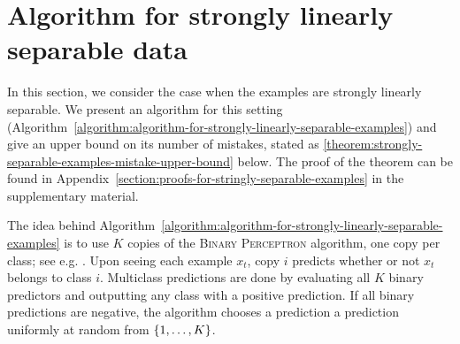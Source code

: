 \section{Algorithm for strongly linearly separable data}
\label{section:algorithm-for-strongly-linearly-separable-data}

In this section, we consider the case when the examples are strongly linearly
separable. We present an algorithm for this setting
(Algorithm~\ref{algorithm:algorithm-for-strongly-linearly-separable-examples})
and give an upper bound on its number of mistakes, stated as
\autoref{theorem:strongly-separable-examples-mistake-upper-bound} below. The
proof of the theorem can be found in
Appendix~\ref{section:proofs-for-stringly-separable-examples} in the
supplementary material.

The idea behind
Algorithm~\ref{algorithm:algorithm-for-strongly-linearly-separable-examples} is
to use $K$ copies of the \textsc{Binary Perceptron} algorithm, one copy per
class; see e.g. \citep[Section 3.3.1]{Shalev-Shwartz-2012}. Upon seeing each
example $x_t$, copy $i$ predicts whether or not $x_t$ belongs to class $i$.
Multiclass predictions are done by evaluating all $K$ binary predictors and
outputting any class with a positive prediction.  If all binary predictions are
negative, the algorithm chooses a prediction a prediction uniformly at random
from $\cbr{1,\ldots,K}$.


